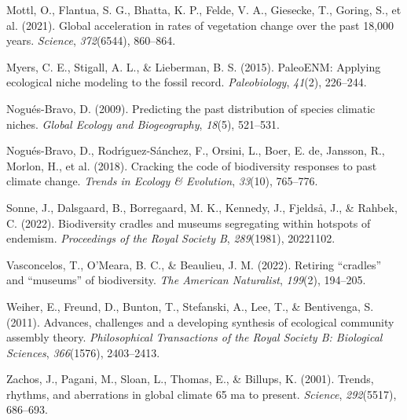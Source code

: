 \documentclass[
]{agujournal2019}
\newlength{\cslhangindent}
\newenvironment{CSLReferences}[2] %
 {\begin{list}{}{%
  \setlength{\itemindent}{0pt}
  \setlength{\leftmargin}{0pt}
  \setlength{\parsep}{0pt}
  \ifodd #1
   \setlength{\leftmargin}{\cslhangindent}
   \setlength{\itemindent}{-1\cslhangindent}
  \fi
  \setlength{\itemsep}{#2\baselineskip}}}
 {\end{list}}
\begin{document}
\begin{CSLReferences}{1}{0}
Mottl, O., Flantua, S. G., Bhatta, K. P., Felde, V. A., Giesecke, T.,
Goring, S., et al. (2021). Global acceleration in rates of vegetation
change over the past 18,000 years. \emph{Science}, \emph{372}(6544),
860--864.

Myers, C. E., Stigall, A. L., \& Lieberman, B. S. (2015). PaleoENM:
Applying ecological niche modeling to the fossil record.
\emph{Paleobiology}, \emph{41}(2), 226--244.

Nogués-Bravo, D. (2009). Predicting the past distribution of species
climatic niches. \emph{Global Ecology and Biogeography}, \emph{18}(5),
521--531.

Nogués-Bravo, D., Rodrı́guez-Sánchez, F., Orsini, L., Boer, E. de,
Jansson, R., Morlon, H., et al. (2018). Cracking the code of
biodiversity responses to past climate change. \emph{Trends in Ecology
\& Evolution}, \emph{33}(10), 765--776.

Sonne, J., Dalsgaard, B., Borregaard, M. K., Kennedy, J., Fjeldså, J.,
\& Rahbek, C. (2022). Biodiversity cradles and museums segregating
within hotspots of endemism. \emph{Proceedings of the Royal Society B},
\emph{289}(1981), 20221102.

Vasconcelos, T., O'Meara, B. C., \& Beaulieu, J. M. (2022). Retiring
{``cradles''} and {``museums''} of biodiversity. \emph{The American
Naturalist}, \emph{199}(2), 194--205.

Weiher, E., Freund, D., Bunton, T., Stefanski, A., Lee, T., \&
Bentivenga, S. (2011). Advances, challenges and a developing synthesis
of ecological community assembly theory. \emph{Philosophical
Transactions of the Royal Society B: Biological Sciences},
\emph{366}(1576), 2403--2413.

Zachos, J., Pagani, M., Sloan, L., Thomas, E., \& Billups, K. (2001).
Trends, rhythms, and aberrations in global climate 65 ma to present.
\emph{Science}, \emph{292}(5517), 686--693.

\end{CSLReferences}
\end{document}
